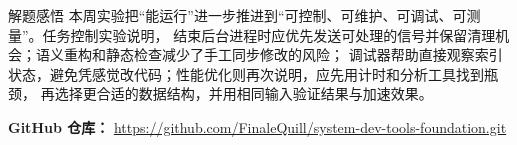\documentclass[UTF8,zihao=-4]{ctexart}
\begin{document}
\vspace{0.7cm}
\begin{summarybox}{解题感悟}
本周实验把“能运行”进一步推进到“可控制、可维护、可调试、可测量”。任务控制实验说明，
结束后台进程时应优先发送可处理的信号并保留清理机会；语义重构和静态检查减少了手工同步修改的风险；
调试器帮助直接观察索引状态，避免凭感觉改代码；性能优化则再次说明，应先用计时和分析工具找到瓶颈，
再选择更合适的数据结构，并用相同输入验证结果与加速效果。
\par\smallskip
\centering
\textbf{GitHub 仓库：}\quad
\url{https://github.com/FinaleQuill/system-dev-tools-foundation.git}
\end{summarybox}
\end{document}
